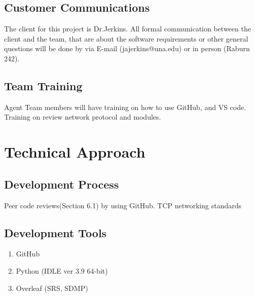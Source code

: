 \documentclass[letterpaper,12pt,oneside,listof=totoc]{scrreprt}
\begin{document}
\section{Customer Communications}
The client for this project is Dr.Jerkins. All formal communication between the client and the team, that are about the software requirements or other general questions will be done by via E-mail (jajerkins@una.edu) or in person (Raburn 242). 

\section{Team Training}
Agent Team members will have training on how to use GitHub, and VS code. Training on review network protocol and modules. 


\chapter{Technical Approach}

\section{Development Process}
Peer code reviews(Section 6.1) by using GitHub. \newline
TCP networking standards\newline





\section{Development Tools}
\begin{enumerate}
\item GitHub
\item Python  (IDLE ver 3.9 64-bit)
\item Overleaf (SRS, SDMP)
\end{enumerate}
\end{document}
